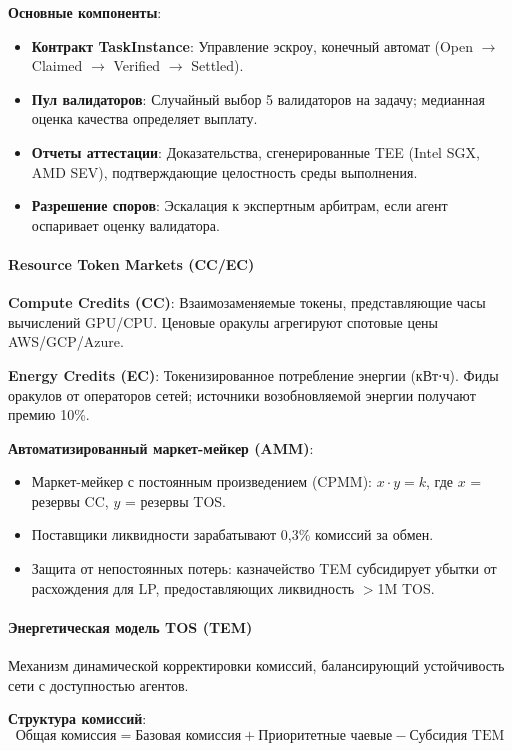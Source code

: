 \documentclass[11pt]{article}
\begin{document}
\textbf{Основные компоненты}:
\begin{itemize}[noitemsep]
  \item \textbf{Контракт TaskInstance}: Управление эскроу, конечный автомат (Open $\to$ Claimed $\to$ Verified $\to$ Settled).
  \item \textbf{Пул валидаторов}: Случайный выбор 5 валидаторов на задачу; медианная оценка качества определяет выплату.
  \item \textbf{Отчеты аттестации}: Доказательства, сгенерированные TEE (Intel SGX, AMD SEV), подтверждающие целостность среды выполнения.
  \item \textbf{Разрешение споров}: Эскалация к экспертным арбитрам, если агент оспаривает оценку валидатора.
\end{itemize}

\paragraph{Resource Token Markets (CC/EC)}
\textbf{Compute Credits (CC)}: Взаимозаменяемые токены, представляющие часы вычислений GPU/CPU. Ценовые оракулы агрегируют спотовые цены AWS/GCP/Azure.

\textbf{Energy Credits (EC)}: Токенизированное потребление энергии (кВт⋅ч). Фиды оракулов от операторов сетей; источники возобновляемой энергии получают премию 10\%.

\textbf{Автоматизированный маркет-мейкер (AMM)}:
\begin{itemize}[noitemsep]
  \item Маркет-мейкер с постоянным произведением (CPMM): $x \cdot y = k$, где $x$ = резервы CC, $y$ = резервы TOS.
  \item Поставщики ликвидности зарабатывают 0,3\% комиссий за обмен.
  \item Защита от непостоянных потерь: казначейство TEM субсидирует убытки от расхождения для LP, предоставляющих ликвидность $>$1M TOS.
\end{itemize}

\paragraph{Энергетическая модель TOS (TEM)}
Механизм динамической корректировки комиссий, балансирующий устойчивость сети с доступностью агентов.

\textbf{Структура комиссий}:
\begin{equation}
\text{Общая комиссия} = \text{Базовая комиссия} + \text{Приоритетные чаевые} - \text{Субсидия TEM}
\end{equation}
\end{document}
